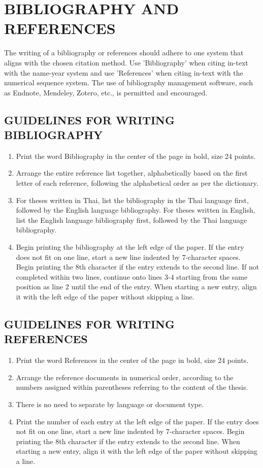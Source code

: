 \chapter{BIBLIOGRAPHY AND REFERENCES}

The writing of a bibliography or references should adhere to one system that aligns with the chosen citation method. Use 'Bibliography' when citing in-text with the name-year system and use 'References' when citing in-text with the numerical sequence system. The use of bibliography management software, such as Endnote, Mendeley, Zotero, etc., is permitted and encouraged.

\section{GUIDELINES FOR WRITING BIBLIOGRAPHY}

\begin{enumerate}
    \item Print the word Bibliography in the center of the page in bold, size 24 points.
    \item Arrange the entire reference list together, alphabetically based on the first letter of each reference, following the alphabetical order as per the dictionary.
    \item For theses written in Thai, list the bibliography in the Thai language first, followed by the English language bibliography. For theses written in English, list the English language bibliography first, followed by the Thai language bibliography.
    \item Begin printing the bibliography at the left edge of the paper. If the entry does not fit on one line, start a new line indented by 7-character spaces. Begin printing the 8th character if the entry extends to the second line. If not completed within two lines, continue onto lines 3-4 starting from the same position as line 2 until the end of the entry. When starting a new entry, align it with the left edge of the paper without skipping a line.
\end{enumerate}

\section{GUIDELINES FOR WRITING REFERENCES}

\begin{enumerate}
    \item Print the word References in the center of the page in bold, size 24 points.
    \item Arrange the reference documents in numerical order, according to the numbers assigned within parentheses referring to the content of the thesis.
    \item There is no need to separate by language or document type.
    \item Print the number of each entry at the left edge of the paper. If the entry does not fit on one line, start a new line indented by 7-character spaces. Begin printing the 8th character if the entry extends to the second line. When starting a new entry, align it with the left edge of the paper without skipping a line.
\end{enumerate}

